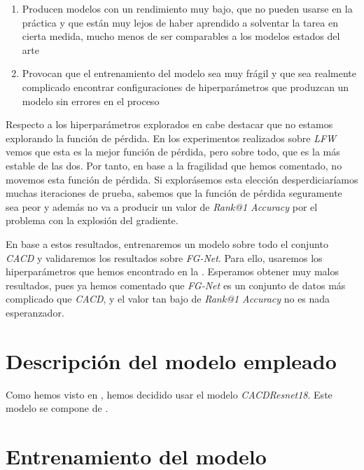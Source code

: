 \begin{enumerate}
    \item Producen modelos con un rendimiento muy bajo, que no pueden usarse en la práctica y que están muy lejos de haber aprendido a solventar la tarea en cierta medida, mucho menos de ser comparables a los modelos estados del arte
    \item Provocan que el entrenamiento del modelo sea muy frágil y que sea realmente complicado encontrar configuraciones de hiperparámetros que produzcan un modelo sin errores en el proceso
\end{enumerate}

Respecto a los hiperparámetros explorados en  cabe destacar que no estamos explorando la función de pérdida. En los experimentos realizados sobre \textit{LFW} vemos que esta es la mejor función de pérdida, pero sobre todo, que es la más estable de las dos. Por tanto, en base a la fragilidad que hemos comentado, no movemos esta función de pérdida. Si explorásemos esta elección desperdiciaríamos muchas iteraciones de prueba, sabemos que la función de pérdida seguramente sea peor y además no va a producir un valor de \textit{Rank@1 Accuracy} por el problema con la explosión del gradiente.

En base a estos resultados, entrenaremos un modelo sobre todo el conjunto \textit{CACD} y validaremos los resultados sobre \textit{FG-Net}. Para ello, usaremos los hiperparámetros que hemos encontrado en la . Esperamos obtener muy malos resultados, pues ya hemos comentado que \textit{FG-Net} es un conjunto de datos más complicado que \textit{CACD}, y el valor tan bajo de \textit{Rank@1 Accuracy} no es nada esperanzador.

\section{Descripción del modelo empleado} \label{isec:explicacion_modelo}

Como hemos visto en , hemos decidido usar el modelo \textit{CACDResnet18}. Este modelo se compone de .

\section{Entrenamiento del modelo} \label{isec:entrenamiento_mejor_modelo}

